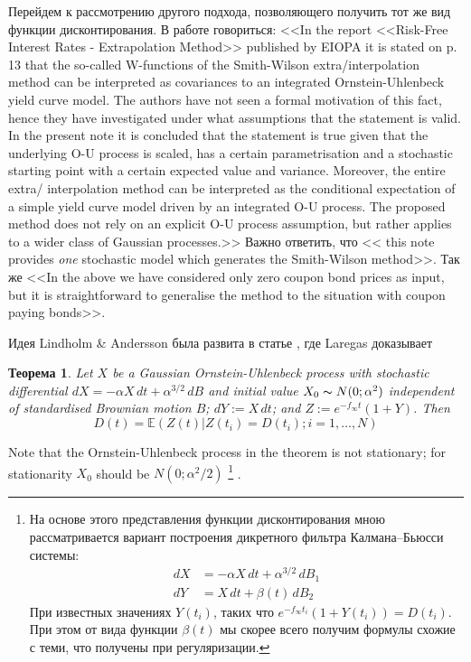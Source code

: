 \documentclass[10pt]{article}
\theoremstyle{definition}
\theoremstyle{remark}
\theoremstyle{plain}
\newtheorem{thm}{Теорема}
\newcommand{\w}{f_\infty}
\begin{document}
Перейдем к рассмотрению другого подхода, позволяющего получить тот же вид функции дисконтирования.  
В работе \cite{Andersson_Lindholm} говориться: <<In the report <<Risk-Free Interest Rates - Extrapolation Method>>
published by EIOPA it is stated on p. 13 that the so-called W-functions
of the Smith-Wilson extra/interpolation method can be interpreted
as covariances to an integrated Ornstein-Uhlenbeck yield curve model.
The authors have not seen a formal motivation of this fact, hence they
have investigated under what assumptions that the statement is valid.
In the present note it is concluded that the statement is true given that
the underlying O-U process is scaled, has a certain parametrisation and
a stochastic starting point with a certain expected value and variance.
Moreover, the entire extra/ interpolation method can be interpreted
as the conditional expectation of a simple yield curve model driven by
an integrated O-U process. The proposed method does not rely on an
explicit O-U process assumption, but rather applies to a wider class of
Gaussian processes.>> Важно ответить, что << this note provides \textit{one} stochastic model which generates the Smith-Wilson method>>. Так же <<In the above we have considered only zero coupon bond prices as input, but
it is straightforward to generalise the method to the situation with coupon
paying bonds>>.

Идея Lindholm \& Andersson была развита в статье \cite[App. B]{Lager}, где Laregas доказывает
\begin{thm}
Let $X$ be a Gaussian Ornstein-Uhlenbeck process with stochastic differential $dX = -\alpha X\,dt + \alpha^{3/2}\, dB$ and initial value $X_0 \thicksim N(0; \alpha^2)$
independent of standardised Brownian motion $B$; $dY := X \,dt$; and $Z:= e^{-\w t}(1 + Y)$. Then
$$
D(t) = \mathbb{E}(Z(t)|Z(t_i) = D(t_i);i=1,\ldots,N)
$$
\end{thm}
Note that the Ornstein-Uhlenbeck process in the theorem is not stationary;
for stationarity $X_0$ should be $N(0;\alpha^2 /2)$
\footnote{
На основе этого представления функции дисконтирования мною рассматривается вариант построения дикретного  фильтра Калмана--Бьюсси системы:
\begin{align*}
dX &= -\alpha X\,dt + \alpha^{3/2}\, dB_1 \\
dY &= X\,dt + \beta(t) \,dB_2
\end{align*}
При известных значениях $Y(t_i)$, таких что $e^{-f_\infty t_i}(1+Y(t_i)) = D(t_i)$. При этом от вида функции $\beta(t)$ мы скорее всего получим формулы схожие с теми, что получены при регуляризации. 
}
.
\end{document}
